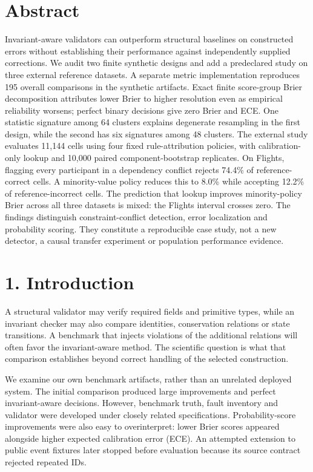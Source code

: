 \hypertarget{abstract}{%
\section{Abstract}\label{abstract}}

Invariant-aware validators can outperform structural baselines on
constructed errors without establishing their performance against
independently supplied corrections. We audit two finite synthetic
designs and add a predeclared study on three external reference
datasets. A separate metric implementation reproduces 195 overall
comparisons in the synthetic artifacts. Exact finite score-group Brier
decomposition attributes lower Brier to higher resolution even as
empirical reliability worsens; perfect binary decisions give zero Brier
and ECE. One statistic signature among 64 clusters explains degenerate
resampling in the first design, while the second has six signatures
among 48 clusters. The external study evaluates 11,144 cells using four
fixed rule-attribution policies, with calibration-only lookup and 10,000
paired component-bootstrap replicates. On Flights, flagging every
participant in a dependency conflict rejects 74.4\% of reference-correct
cells. A minority-value policy reduces this to 8.0\% while accepting
12.2\% of reference-incorrect cells. The prediction that lookup improves
minority-policy Brier across all three datasets is mixed: the Flights
interval crosses zero. The findings distinguish constraint-conflict
detection, error localization and probability scoring. They constitute a
reproducible case study, not a new detector, a causal transfer
experiment or population performance evidence.

\hypertarget{introduction}{%
\section{1. Introduction}\label{introduction}}

A structural validator may verify required fields and primitive types,
while an invariant checker may also compare identities, conservation
relations or state transitions. A benchmark that injects violations of
the additional relations will often favor the invariant-aware method.
The scientific question is what that comparison establishes beyond
correct handling of the selected construction.

We examine our own benchmark artifacts, rather than an unrelated
deployed system. The initial comparison produced large improvements and
perfect invariant-aware decisions. However, benchmark truth, fault
inventory and validator were developed under closely related
specifications. Probability-score improvements were also easy to
overinterpret: lower Brier scores appeared alongside higher expected
calibration error (ECE). An attempted extension to public event fixtures
later stopped before evaluation because its source contract rejected
repeated IDs.

